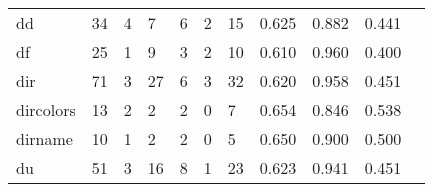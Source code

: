\begin{longtable}{lp{1.20cm}p{1.20cm}p{1.20cm}p{1.20cm}p{1.20cm}p{1.20cm}p{1.20cm}p{1.20cm}p{1.20cm}p{1.20cm}}
dd        &                                    34 &                                                  4 &                                                  7 &                                                  6 &                                                  2 &                                                 15 &                                         0.625 &                                              0.882 &                                              0.441 \\
df        &                                    25 &                                                  1 &                                                  9 &                                                  3 &                                                  2 &                                                 10 &                                         0.610 &                                              0.960 &                                              0.400 \\
dir       &                                    71 &                                                  3 &                                                 27 &                                                  6 &                                                  3 &                                                 32 &                                         0.620 &                                              0.958 &                                              0.451 \\
dircolors &                                    13 &                                                  2 &                                                  2 &                                                  2 &                                                  0 &                                                  7 &                                         0.654 &                                              0.846 &                                              0.538 \\
dirname   &                                    10 &                                                  1 &                                                  2 &                                                  2 &                                                  0 &                                                  5 &                                         0.650 &                                              0.900 &                                              0.500 \\
du        &                                    51 &                                                  3 &                                                 16 &                                                  8 &                                                  1 &                                                 23 &                                         0.623 &                                              0.941 &                                              0.451 \\

\end{longtable}
